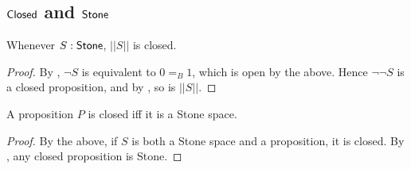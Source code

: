 \subsection{$\mathsf{Closed}$ and $\mathsf{Stone}$}

\begin{corollary}\label{TruncationStoneClosed}
  Whenever $S:\mathsf{Stone}$, $||S||$ is closed. 
\end{corollary}
\begin{proof}
  By , $\neg S$ is equivalent to $0=_B 1$, which is open by the above. 
  Hence $\neg \neg S$ is a closed proposition, and by , so is $||S||$. 
\end{proof}


\begin{corollary}\label{PropositionsClosedIffStone}
  A proposition $P$ is closed iff it is a Stone space. 
\end{corollary}
\begin{proof}
  By the above, if $S$ is both a Stone space and a proposition, it is closed. 
  By , any closed proposition is Stone. 
\end{proof}


